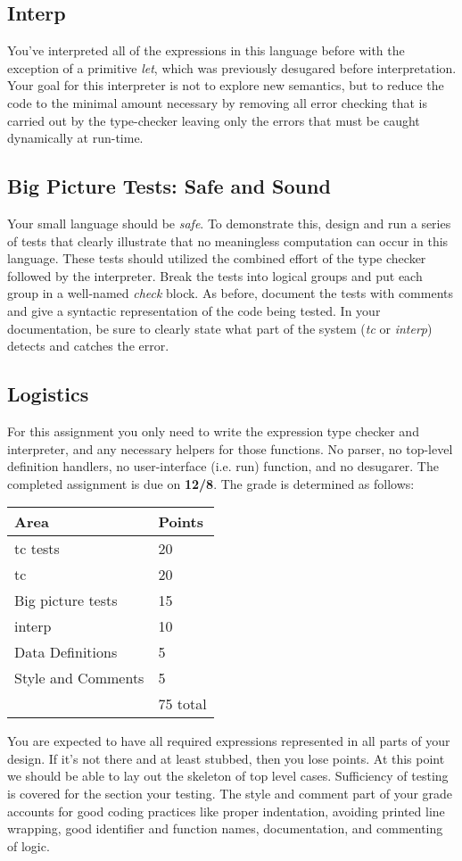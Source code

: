 \documentclass[10pt]{article}
\begin{document}
\subsection*{Interp}

You've interpreted all of the expressions in this language before with the exception of a primitive \textit{let}, which was previously desugared before interpretation. Your goal for this interpreter is not to explore new semantics, but to reduce the code to the minimal amount necessary by removing all error checking that is carried out by the type-checker leaving only the errors that must be caught dynamically at run-time. 

\subsection*{Big Picture Tests: Safe and Sound}

Your small language should be \textit{safe}. To demonstrate this, design and run a series of tests that clearly illustrate that no meaningless computation can occur in this language. These tests should utilized the combined effort of the type checker followed by the interpreter. Break the tests into logical groups and put each group in a well-named \textit{check} block. As before, document the tests with comments and give a syntactic representation of the code being tested. In your documentation, be sure to clearly state what part of the system (\textit{tc} or \textit{interp}) detects and catches the error. 


\subsection*{Logistics}

For this assignment you only need to write the expression type checker and interpreter, and any necessary helpers for those functions. No parser, no top-level definition handlers, no user-interface (i.e. run) function, and no desugarer. The completed assignment is due on \textbf{12/8}. The grade is determined as follows:

\begin{center}
\begin{tabular}{ll}
Area & Points \\ \hline
tc tests & 20 \\
tc & 20 \\
Big picture tests & 15 \\ 
interp & 10 \\
Data Definitions & 5 \\
Style and Comments & 5 \\ \hline
 & 75 total
\end{tabular}
\end{center}

You are expected to have all required expressions represented in all parts of your design. If it's not there and at least stubbed, then you lose points. At this point we should be able to lay out the skeleton of top level cases. Sufficiency of testing is covered for the section your testing. The style and comment part of your grade accounts for good coding practices like proper indentation, avoiding printed line wrapping, good identifier and function names, documentation, and commenting of logic. 
\end{document}
